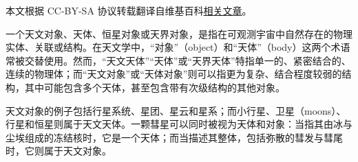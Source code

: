 
本文根据 CC-BY-SA 协议转载翻译自维基百科\href{https://en.wikipedia.org/wiki/Astronomical_object}{相关文章}。

一个天文对象、天体、恒星对象或天界对象，是指在可观测宇宙中自然存在的物理实体、关联或结构。在天文学中，“对象”（object）和“天体”（body）这两个术语常被交替使用。然而，“天文天体”“天体”或“天界天体”特指单一的、紧密结合的、连续的物理体；而“天文对象”或“天体对象”则可以指更为复杂、结合程度较弱的结构，其中可能包含多个天体，甚至包含带有次级结构的其他对象。

天文对象的例子包括行星系统、星团、星云和星系；而小行星、卫星（moons）、行星和恒星则属于天文天体。一颗彗星可以同时被视为天体和对象：当指其由冰与尘埃组成的冻结核时，它是一个天体；而当描述其整体，包括弥散的彗发与彗尾时，它则属于天文对象。

